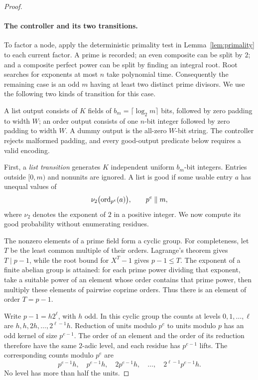 \begin{proof}
\paragraph{The controller and its two transitions.}
To factor a node, apply the deterministic primality test in
Lemma~\ref{lem:primality} to each current factor.  A prime is recorded;
an even composite can be split by $2$; and a composite perfect power can
be split by finding an integral root.  Root searches for exponents at
most $n$ take polynomial time.  Consequently the remaining case is an odd
$m$ having at least two distinct prime divisors.  We use the following two
kinds of transition for this case.

A list output consists of $K$ fields of $b_m=\lceil\log_2m\rceil$ bits,
followed by zero padding to width $W$; an order output consists of one
$n$-bit integer followed by zero padding to width $W$.  A dummy output is
the all-zero $W$-bit string.  The controller rejects malformed padding,
and every good-output predicate below requires a valid encoding.

First, a \emph{list transition} generates $K$ independent uniform
$b_m$-bit integers.  Entries outside
$[0,m)$ and nonunits are ignored.  A list is good if some usable entry $a$
has unequal values of
\[
 \nu_2\bigl(\operatorname{ord}_{p^e}(a)\bigr),\qquad p^e\parallel m,
\]
where $\nu_2$ denotes the exponent of $2$ in a positive integer.
We now compute its good probability without enumerating residues.

The nonzero elements of a prime field form a cyclic group.  For
completeness, let $T$ be the least common multiple of their orders.
Lagrange's theorem gives $T\mid p-1$, while the root bound for $X^T-1$
gives $p-1\le T$.  The exponent of a finite abelian group is attained:
for each prime power dividing that exponent, take a suitable power of an
element whose order contains that prime power, then multiply these
elements of pairwise coprime orders.  Thus there is an element of order
$T=p-1$.

Write $p-1=h2^\ell$, with $h$ odd.  In this cyclic group the counts at
levels $0,1,\ldots,\ell$ are
$h,h,2h,\ldots,2^{\ell-1}h$.  Reduction of units modulo $p^e$ to units
modulo $p$ has an odd kernel of size $p^{e-1}$.  The order of an element
and the order of its reduction therefore have the same $2$-adic level,
and each residue has $p^{e-1}$ lifts.  The corresponding counts modulo
$p^e$ are
\begin{equation}\label{eq:level-counts}
 p^{e-1}h,\quad p^{e-1}h,\quad
 2p^{e-1}h,\quad\ldots,\quad 2^{\ell-1}p^{e-1}h.
\end{equation}
No level has more than half the units.


\end{proof}
